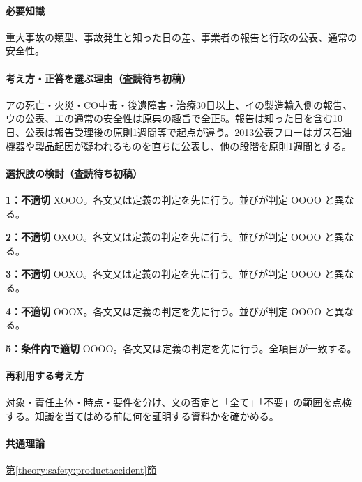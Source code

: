 \paragraph{必要知識} 重大事故の類型、事故発生と知った日の差、事業者の報告と行政の公表、通常の安全性。

\paragraph{考え方・正答を選ぶ理由（査読待ち初稿）} アの死亡・火災・CO中毒・後遺障害・治療30日以上、イの製造輸入側の報告、ウの公表、エの通常の安全性は原典の趣旨で全正5。報告は知った日を含む10日、公表は報告受理後の原則1週間等で起点が違う。2013公表フローはガス石油機器や製品起因が疑われるものを直ちに公表し、他の段階を原則1週間とする。

\paragraph{選択肢の検討（査読待ち初稿）}\mbox{}\par

\noindent\textbf{1：不適切} XOOO。各文又は定義の判定を先に行う。並びが判定 OOOO と異なる。\par

\noindent\textbf{2：不適切} OXOO。各文又は定義の判定を先に行う。並びが判定 OOOO と異なる。\par

\noindent\textbf{3：不適切} OOXO。各文又は定義の判定を先に行う。並びが判定 OOOO と異なる。\par

\noindent\textbf{4：不適切} OOOX。各文又は定義の判定を先に行う。並びが判定 OOOO と異なる。\par

\noindent\textbf{5：条件内で適切} OOOO。各文又は定義の判定を先に行う。全項目が一致する。\par

\paragraph{再利用する考え方} 対象・責任主体・時点・要件を分け、文の否定と「全て」「不要」の範囲を点検する。知識を当てはめる前に何を証明する資料かを確かめる。

\paragraph{共通理論} \hyperref[theory:safety:productaccident]{第\ref*{theory:safety:productaccident}節}

